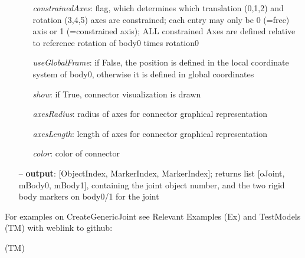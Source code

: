 \begin{itemize}[leftmargin=0.7cm]
\begin{itemize}[leftmargin=1.2cm]
\item[]{\it constrainedAxes}: flag, which determines which translation (0,1,2) and rotation (3,4,5) axes are constrained; each entry may only be 0 (=free) axis or 1 (=constrained axis); ALL constrained Axes are defined relative to reference rotation of body0 times rotation0
\item[]{\it useGlobalFrame}: if False, the position is defined in the local coordinate system of body0, otherwise it is defined in global coordinates
\item[]{\it show}: if True, connector visualization is drawn
\item[]{\it axesRadius}: radius of axes for connector graphical representation
\item[]{\it axesLength}: length of axes for connector graphical representation
\item[]{\it color}: color of connector
\end{itemize}
\item[--]
{\bf output}: [ObjectIndex, MarkerIndex, MarkerIndex]; returns list [oJoint, mBody0, mBody1], containing the joint object number, and the two rigid body markers on body0/1 for the joint
\vspace{12pt}\end{itemize}
%

%
\noindent For examples on CreateGenericJoint see Relevant Examples (Ex) and TestModels (TM) with weblink to github:
\bi
 \item \footnotesize {} (TM)
\ei

